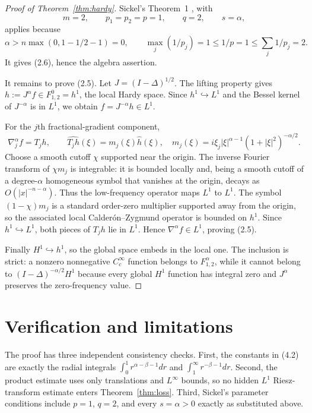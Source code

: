 \documentclass[11pt]{article}
\begin{document}
\begin{proof}[Proof of Theorem~\ref{thm:hardy}]
Sickel's Theorem~1 \cite{Sickel}, with
\[
 m=2,\qquad p_1=p_2=p=1,\qquad q=2,\qquad s=\alpha,
\]
applies because
\[
 \alpha>n\max(0,1-1/2-1)=0,
 \qquad \max_j(1/p_j)=1\le1/p=1\le\sum_j1/p_j=2.
\]
It gives (2.6), hence the algebra assertion.

It remains to prove (2.5).  Let $J=(I-\Delta)^{1/2}$.  The lifting property
gives $h:=J^\alpha f\in F^0_{1,2}=h^1$, the local Hardy space.  Since
$h^1\hookrightarrow L^1$ and the Bessel kernel of $J^{-\alpha}$ is in
$L^1$, we obtain $f=J^{-\alpha}h\in L^1$.

For the $j$th fractional-gradient component,
\[
 \nabla^\alpha_j f=T_jh,\qquad
 \widehat{T_jh}(\xi)=m_j(\xi)\widehat h(\xi),
 \quad
 m_j(\xi)=i\xi_j|\xi|^{\alpha-1}(1+|\xi|^2)^{-\alpha/2}.   \tag{4.4}
\]
Choose a smooth cutoff $\chi$ supported near the origin.  The inverse Fourier
transform of $\chi m_j$ is integrable: it is bounded locally and, being a
smooth cutoff of a degree-$\alpha$ homogeneous symbol that vanishes at the
origin, decays as $O(|x|^{-n-\alpha})$.  Thus the low-frequency operator maps
$L^1$ to $L^1$.  The symbol $(1-\chi)m_j$ is a standard order-zero multiplier
supported away from the origin, so the associated local
Calder\'on--Zygmund operator is bounded on $h^1$.  Since $h^1\hookrightarrow
L^1$, both pieces of $T_jh$ lie in $L^1$.  Hence
$\nabla^\alpha f\in L^1$, proving (2.5).

Finally $H^1\hookrightarrow h^1$, so the global space embeds in the local
one.  The inclusion is strict: a nonzero nonnegative $C_c^\infty$ function
belongs to $F^\alpha_{1,2}$, while it cannot belong to
$(I-\Delta)^{-\alpha/2}H^1$ because every global $H^1$ function has integral
zero and $J^\alpha$ preserves the zero-frequency value.
\end{proof}

\section{Verification and limitations}

The proof has three independent consistency checks.
First, the constants in (4.2) are exactly the radial integrals
$\int_0^1r^{\alpha-\beta-1}dr$ and
$\int_1^\infty r^{-\beta-1}dr$.  Second, the product estimate uses only
translations and $L^\infty$ bounds, so no hidden $L^1$ Riesz-transform
estimate enters Theorem~\ref{thm:loss}.  Third, Sickel's parameter conditions
include $p=1$, $q=2$, and every $s=\alpha>0$ exactly as substituted above.
\end{document}
